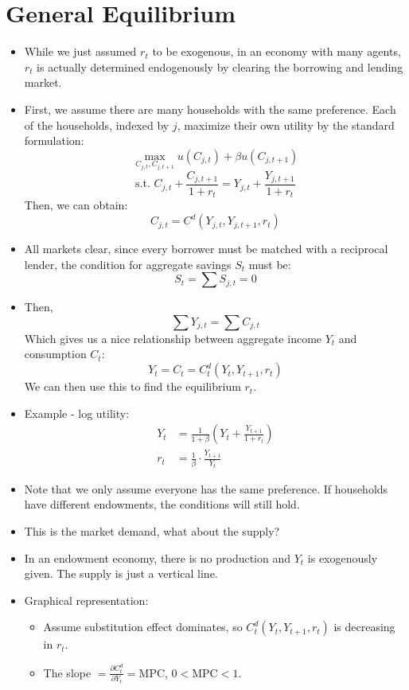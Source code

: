 \documentclass[notitlepage]{article}
\begin{document}
\section{General Equilibrium}
\begin{itemize}
\item While we just assumed $r_t$ to be exogenous, in an economy with many agents, $r_t$ is actually determined endogenously by clearing the borrowing and lending market.
\item First, we assume there are many households with the same preference. Each of the households, indexed by $j$, maximize their own utility by the standard formulation:
\[
\max_{C_{j,t}, C_{j,t+1}} u(C_{j,t}) + \beta u(C_{j,t+1})
\]
\[
\text{s.t. } C_{j,t} + \frac{C_{j,t+1}}{1+r_t} = Y_{j,t} + \frac{Y_{j,t+1}}{1+r_t}
\]
Then, we can obtain:
\[
C_{j,t} = C^d(Y_{j,t}, Y_{j,t+1}, r_t)
\]
\item All markets clear, since every borrower must be matched with a reciprocal lender, the condition for aggregate savings $S_t$ must be:
\[
S_t = \sum S_{j,t} = 0
\]
\item Then,
\[
\sum Y_{j,t} = \sum C_{j,t}
\]
Which gives us a nice relationship between aggregate income $Y_t$ and consumption $C_t$:
\[
Y_t = C_t = C^d_t(Y_t, Y_{t+1}, r_t)
\]
We can then use this to find the equilibrium $r_t$.
\item Example - log utility:
\begin{align*}
Y_t &= \frac{1}{1+\beta}\left(Y_t + \frac{Y_{t+1}}{1+r_t}\right) \\
r_t &= \frac{1}{\beta} \cdot \frac{Y_{t+1}}{Y_t}
\end{align*}

\item Note that we only assume everyone has the same preference. If households have different endowments, the conditions will still hold.

\item This is the market demand, what about the supply?
\item In an endowment economy, there is no production and $Y_t$ is exogenously given. The supply is just a vertical line.

\item Graphical representation:
\begin{itemize}
\item Assume substitution effect dominates, so $C^d_t(Y_t, Y_{t+1}, r_t)$ is decreasing in $r_t$.
\item The slope $= \frac{\partial C^d_t}{\partial Y_t} = \text{MPC}$, $0 < \text{MPC} < 1$.
\end{itemize}

\begin{figure}[h]
    \centering
    \resizebox{0.5\textwidth}{!}{
    
    }
\end{figure}

\end{itemize}
\end{document}
